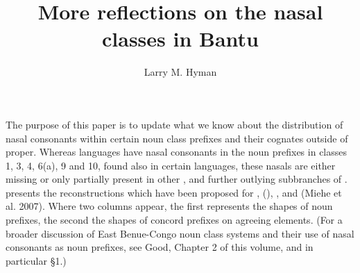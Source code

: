 \documentclass[output=paper]{langsci/langscibook}
\author{Larry M. Hyman\affiliation{University of California, Berkeley}}
\title{More reflections on the nasal classes in Bantu}
\begin{document}
\label{sec:7}
 
  
\noindent 
The purpose of this paper is to update what we know about the distribution of nasal consonants within certain  noun class prefixes and their cognates outside of  proper. Whereas  languages have nasal consonants in the noun prefixes in classes 1, 3, 4, 6(a), 9 and 10, found also in certain  languages, these nasals are either missing or only partially present in other ,  and further outlying subbranches of .  presents the reconstructions which have been proposed for  \citep{Meeussen1967},  (\citealt{deWolf1971}),  \citep{Hyman1980nasalclasses}, and  (Miehe et al. 2007). Where two columns appear, the first represents the shapes of noun prefixes, the second the shapes of concord prefixes on agreeing elements. (For a broader discussion of East Benue-Congo noun class systems and their use of nasal consonants as noun prefixes, see Good, Chapter 2 of this volume, and in particular §1.)

\newpage 
\begin{table}
\caption{Reconstructions of Relevant Niger-Congo Noun Class Prefixes}
\label{tab:nasal:1}
\end{table}
\end{document}
